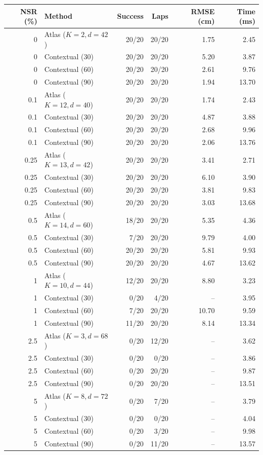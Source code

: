 \begin{tabular}{rlrrrr}
\toprule
NSR (\%) & Method & Success & Laps & RMSE (cm) & Time (ms) \\
\midrule
0 & Atlas ($K=2,d=42$) & 20/20 & 20/20 & 1.75 & 2.45 \\
0 & Contextual (30) & 20/20 & 20/20 & 5.20 & 3.87 \\
0 & Contextual (60) & 20/20 & 20/20 & 2.61 & 9.76 \\
0 & Contextual (90) & 20/20 & 20/20 & 1.94 & 13.70 \\
0.1 & Atlas ($K=12,d=40$) & 20/20 & 20/20 & 1.74 & 2.43 \\
0.1 & Contextual (30) & 20/20 & 20/20 & 4.87 & 3.88 \\
0.1 & Contextual (60) & 20/20 & 20/20 & 2.68 & 9.96 \\
0.1 & Contextual (90) & 20/20 & 20/20 & 2.06 & 13.76 \\
0.25 & Atlas ($K=13,d=42$) & 20/20 & 20/20 & 3.41 & 2.71 \\
0.25 & Contextual (30) & 20/20 & 20/20 & 6.10 & 3.90 \\
0.25 & Contextual (60) & 20/20 & 20/20 & 3.81 & 9.83 \\
0.25 & Contextual (90) & 20/20 & 20/20 & 3.03 & 13.68 \\
0.5 & Atlas ($K=14,d=60$) & 18/20 & 20/20 & 5.35 & 4.36 \\
0.5 & Contextual (30) & 7/20 & 20/20 & 9.79 & 4.00 \\
0.5 & Contextual (60) & 20/20 & 20/20 & 5.81 & 9.93 \\
0.5 & Contextual (90) & 20/20 & 20/20 & 4.67 & 13.62 \\
1 & Atlas ($K=10,d=44$) & 12/20 & 20/20 & 8.80 & 3.23 \\
1 & Contextual (30) & 0/20 & 4/20 & -- & 3.95 \\
1 & Contextual (60) & 7/20 & 20/20 & 10.70 & 9.59 \\
1 & Contextual (90) & 11/20 & 20/20 & 8.14 & 13.34 \\
2.5 & Atlas ($K=3,d=68$) & 0/20 & 12/20 & -- & 3.62 \\
2.5 & Contextual (30) & 0/20 & 0/20 & -- & 3.86 \\
2.5 & Contextual (60) & 0/20 & 20/20 & -- & 9.87 \\
2.5 & Contextual (90) & 0/20 & 20/20 & -- & 13.51 \\
5 & Atlas ($K=8,d=72$) & 0/20 & 7/20 & -- & 3.79 \\
5 & Contextual (30) & 0/20 & 0/20 & -- & 4.04 \\
5 & Contextual (60) & 0/20 & 3/20 & -- & 9.98 \\
5 & Contextual (90) & 0/20 & 11/20 & -- & 13.57 \\
\bottomrule
\end{tabular}
